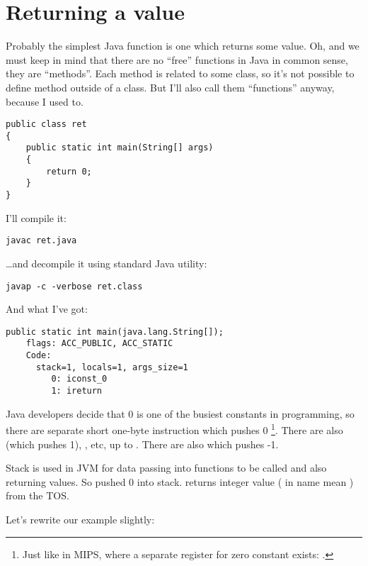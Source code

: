 \section{Returning a value}

Probably the simplest Java function is one which returns some value.
Oh, and we must keep in mind that there are no ``free'' functions in Java in common sense,
they are ``methods''. 
Each method is related to some class, so it's not possible to define
method outside of a class.
But I'll also call them ``functions'' anyway, because I used to.

\begin{lstlisting}
public class ret
{
	public static int main(String[] args) 
	{
		return 0;
	}
}
\end{lstlisting}

I'll compile it:

\begin{lstlisting}
javac ret.java
\end{lstlisting}

\dots and decompile it using standard Java utility:

\begin{lstlisting}
javap -c -verbose ret.class
\end{lstlisting}

And what I've got:

\begin{lstlisting}[caption=JDK 1.7 (excerpt)]
  public static int main(java.lang.String[]);
    flags: ACC_PUBLIC, ACC_STATIC
    Code:
      stack=1, locals=1, args_size=1
         0: iconst_0      
         1: ireturn       
\end{lstlisting}

Java developers decide that 0 is one of the busiest constants in programming, 
so there are separate short one-byte  instruction which pushes 0
\footnote{Just like in MIPS, where a separate register for zero constant exists: 
.}.
There are also  (which pushes 1), , etc, 
up to . 
There are also  which pushes -1.

Stack is used in JVM for data passing into functions to be called and also returning values.
So  pushed 0 into stack.
 returns integer value ( in name mean ) from the \ac{TOS}.

Let's rewrite our example slightly:

